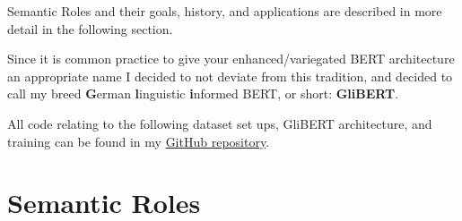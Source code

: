 Semantic Roles and their goals, history, and applications are described in more detail
in the following section.

Since it is common practice to give your enhanced/variegated BERT architecture an appropriate
name I decided to not deviate from this tradition, and decided to call my breed \textbf{G}erman
\textbf{l}inguistic \textbf{i}nformed BERT, or short: \textbf{GliBERT}.

All code relating to the following dataset set ups, GliBERT architecture, and training can be found in
my \href{https://github.com/JonathanSchaber/Masterarbeit}{GitHub repository}.


\section{Semantic Roles}
\label{sec:semantic-roles}



